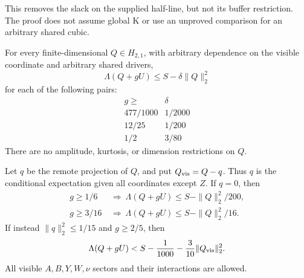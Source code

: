 This removes the slack on the supplied half-line, but not its buffer
restriction. The proof does not assume global K or use an unproved
comparison for an arbitrary shared cubic.

\begin{theorem}
\label{thm:all-cubic-buffer}
For every finite-dimensional $Q\in H_{2,1}$, with arbitrary dependence
on the visible coordinate and arbitrary shared drivers,
\[
 \Lambda(Q+gU)\le S-\delta\|Q\|_2^2
\]
for each of the following pairs:
\[
\begin{array}{c|c}
g\ge & \delta\\ \hline
477/1000&1/2000\\
12/25&1/200\\
1/2&3/80
\end{array}
\]
There are no amplitude, kurtosis, or dimension restrictions on $Q$.
\end{theorem}

\begin{theorem}
\label{thm:sector-buffer}
Let $q$ be the remote projection of $Q$, and put $Q_{\rm vis}=Q-q$.
Thus $q$ is the conditional expectation given all coordinates except $Z$.
If $q=0$, then
\[
 \begin{split}
 g\ge1/6&\ \Longrightarrow\
       \Lambda(Q+gU)\le S-\|Q\|_2^2/200,\\
 g\ge3/16&\ \Longrightarrow\
       \Lambda(Q+gU)\le S-\|Q\|_2^2/16.
 \end{split}
\]
If instead $\|q\|_2^2\le1/15$ and $g\ge2/5$, then
\[
 \Lambda(Q+gU)<S-\frac1{1000}-\frac3{10}\|Q_{\rm vis}\|_2^2.
\]
All visible $A,B,Y,W,\nu$ sectors and their interactions are allowed.
\end{theorem}

